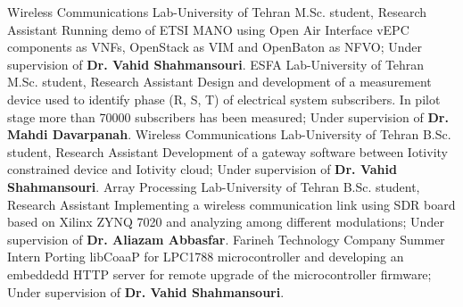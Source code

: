 {}
{Wireless Communications Lab-University of Tehran}
{M.Sc. student, Research Assistant}
{
  Running demo of ETSI MANO using Open Air Interface vEPC components as VNFs, OpenStack as VIM and OpenBaton as NFVO;
  Under supervision of \textbf{Dr. Vahid Shahmansouri}.
}
\medskip
{}
{}
{ESFA Lab-University of Tehran}
{M.Sc. student, Research Assistant}
{
  Design and development of a measurement device used to identify phase (R, S, T) of electrical system subscribers.
  In pilot stage more than 70000 subscribers has been measured;
  Under supervision of \textbf{Dr. Mahdi Davarpanah}.
}
\medskip
{}
{}
{Wireless Communications Lab-University of Tehran}
{B.Sc. student, Research Assistant}
{
  Development of a gateway software between Iotivity constrained  device and Iotivity cloud;
  Under supervision of \textbf{Dr. Vahid Shahmansouri}.
}
\medskip
{}
{}
{Array Processing Lab-University of Tehran}
{B.Sc. student, Research Assistant}
{
  Implementing a wireless communication link using SDR board based on Xilinx ZYNQ 7020 and analyzing among different modulations;
  Under supervision of \textbf{Dr. Aliazam Abbasfar}.
}
\medskip
{}
{}
{Farineh Technology Company}
{Summer Intern}
{
  Porting libCoaaP for LPC1788 microcontroller and developing an embeddedd HTTP server for remote upgrade of the microcontroller firmware;
  Under supervision of \textbf{Dr. Vahid Shahmansouri}.
}
\medskip
